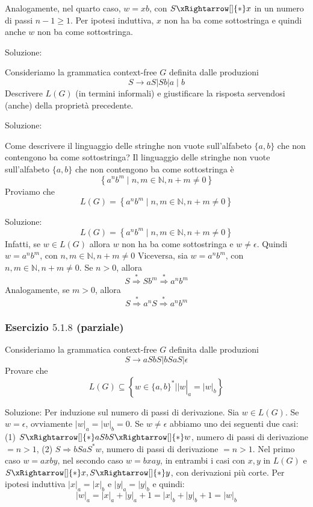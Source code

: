 Analogamente, nel quarto caso, $w=x b$, con $S \xRightarrow[]{*} x$ in un numero di passi $n-1 \geq 1$. Per ipotesi induttiva, $x$ non ha ba come sottostringa e quindi anche $w$ non ba come sottostringa.

\vspace{5mm}

Soluzione:

Consideriamo la grammatica context-free $G$ definita dalle produzioni
$$
S \rightarrow a S|S b| a \mid b
$$
Descrivere $L(G)$ (in termini informali) e giustificare la risposta servendosi (anche) della proprietà precedente.

\vspace{5mm}

Soluzione:

Come descrivere il linguaggio delle stringhe non vuote sull'alfabeto $\{a, b\}$ che non contengono ba come sottostringa? Il linguaggio delle stringhe non vuote sull'alfabeto $\{a, b\}$ che non contengono ba come sottostringa è
$$
\left\{a^{n} b^{m} \mid n, m \in \mathbb{N}, n+m \neq 0\right\}
$$
Proviamo che
$$
L(G)=\left\{a^{n} b^{m} \mid n, m \in \mathbb{N}, n+m \neq 0\right\}
$$

Soluzione:
$$
L(G)=\left\{a^{n} b^{m} \mid n, m \in \mathbb{N}, n+m \neq 0\right\}
$$
Infatti, se $w \in L(G)$ allora $w$ non ha ba come sottostringa e $w \neq \epsilon$. Quindi $w=a^{n} b^{m}$, con $n, m \in \mathbb{N}, n+m \neq 0$
Viceversa, sia $w=a^{n} b^{m}$, con $n, m \in \mathbb{N}, n+m \neq 0 .$ Se $n>0$, allora
$$
S \stackrel{*}{\Rightarrow} S b^{m} \stackrel{*}{\Rightarrow} a^{n} b^{m}
$$
Analogamente, se $m>0$, allora
$$
S \stackrel{*}{\Rightarrow} a^{n} S \stackrel{*}{\Rightarrow} a^{n} b^{m}
$$

\subsubsection{Esercizio $5.1 .8$ (parziale)}
Consideriamo la grammatica context-free $G$ definita dalle produzioni
$$
S \rightarrow a S b S|b S a S| \epsilon
$$
Provare che
$$
L(G) \subseteq\left\{\left.w \in\{a, b\}^{*}|| w\right|_{a}=|w|_{b}\right\}
$$

Soluzione:
Per induzione sul numero di passi di derivazione. Sia $w \in L(G) .$
Se $w=\epsilon$, ovviamente $|w|_{a}=|w|_{b}=0 .$
Se $w \neq \epsilon$ abbiamo uno dei seguenti due casi:
(1) $S \xRightarrow[]{*} a S b S \xRightarrow[]{*} w$, numero di passi di derivazione $=n>1$,
(2) $S \Rightarrow b S a S^{*} w$, numero di passi di derivazione $=n>1$.
Nel primo caso $w=a x b y$, nel secondo caso $w=b x a y$, in entrambi i casi con $x, y$ in $L(G)$ e $S \xRightarrow[]{*} x, S \xRightarrow[]{*} y$, con derivazioni più corte. Per ipotesi induttiva $|x|_{a}=|x|_{b}$ e $|y|_{a}=|y|_{b}$ e quindi:
$$
|w|_{a}=|x|_{a}+|y|_{a}+1=|x|_{b}+|y|_{b}+1=|w|_{b}
$$

